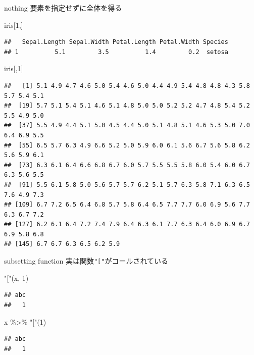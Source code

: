\documentclass[
  ignorenonframetext,
]{beamer}
\newenvironment{Shaded}{\begin{snugshade}}{\end{snugshade}}
\newcommand{\DecValTok}[1]{\textcolor[rgb]{0.00,0.00,0.81}{#1}}
\newcommand{\NormalTok}[1]{#1}
\newcommand{\SpecialCharTok}[1]{\textcolor[rgb]{0.00,0.00,0.00}{#1}}
\newcommand{\StringTok}[1]{\textcolor[rgb]{0.31,0.60,0.02}{#1}}
\begin{document}
\begin{frame}[fragile]{nothing}
\protect\hypertarget{nothing}{}
要素を指定せずに全体を得る

\begin{Shaded}
\begin{Highlighting}[]
\NormalTok{iris[}\DecValTok{1}\NormalTok{,]}
\end{Highlighting}
\end{Shaded}

\begin{verbatim}
##   Sepal.Length Sepal.Width Petal.Length Petal.Width Species
## 1          5.1         3.5          1.4         0.2  setosa
\end{verbatim}

\begin{Shaded}
\begin{Highlighting}[]
\NormalTok{iris[,}\DecValTok{1}\NormalTok{]}
\end{Highlighting}
\end{Shaded}

\begin{verbatim}
##   [1] 5.1 4.9 4.7 4.6 5.0 5.4 4.6 5.0 4.4 4.9 5.4 4.8 4.8 4.3 5.8 5.7 5.4 5.1
##  [19] 5.7 5.1 5.4 5.1 4.6 5.1 4.8 5.0 5.0 5.2 5.2 4.7 4.8 5.4 5.2 5.5 4.9 5.0
##  [37] 5.5 4.9 4.4 5.1 5.0 4.5 4.4 5.0 5.1 4.8 5.1 4.6 5.3 5.0 7.0 6.4 6.9 5.5
##  [55] 6.5 5.7 6.3 4.9 6.6 5.2 5.0 5.9 6.0 6.1 5.6 6.7 5.6 5.8 6.2 5.6 5.9 6.1
##  [73] 6.3 6.1 6.4 6.6 6.8 6.7 6.0 5.7 5.5 5.5 5.8 6.0 5.4 6.0 6.7 6.3 5.6 5.5
##  [91] 5.5 6.1 5.8 5.0 5.6 5.7 5.7 6.2 5.1 5.7 6.3 5.8 7.1 6.3 6.5 7.6 4.9 7.3
## [109] 6.7 7.2 6.5 6.4 6.8 5.7 5.8 6.4 6.5 7.7 7.7 6.0 6.9 5.6 7.7 6.3 6.7 7.2
## [127] 6.2 6.1 6.4 7.2 7.4 7.9 6.4 6.3 6.1 7.7 6.3 6.4 6.0 6.9 6.7 6.9 5.8 6.8
## [145] 6.7 6.7 6.3 6.5 6.2 5.9
\end{verbatim}
\end{frame}

\begin{frame}[fragile]{subsetting function}
\protect\hypertarget{subsetting-function}{}
実は関数\texttt{"{[}"}がコールされている

\begin{Shaded}
\begin{Highlighting}[]
\StringTok{"["}\NormalTok{(x, }\DecValTok{1}\NormalTok{)}
\end{Highlighting}
\end{Shaded}

\begin{verbatim}
## abc 
##   1
\end{verbatim}

\begin{Shaded}
\begin{Highlighting}[]
\NormalTok{x }\SpecialCharTok{\%\textgreater{}\%} \StringTok{"["}\NormalTok{(}\DecValTok{1}\NormalTok{)}
\end{Highlighting}
\end{Shaded}

\begin{verbatim}
## abc 
##   1
\end{verbatim}
\end{frame}
\end{document}
